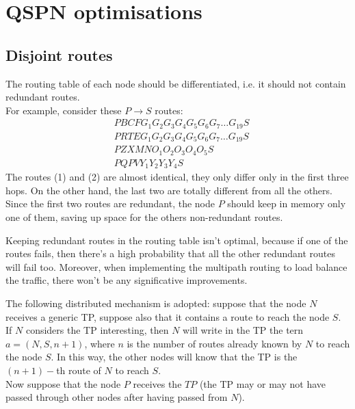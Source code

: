 \documentclass[a4paper]{article}
\begin{document}
%

\section{QSPN optimisations}
\subsection{Disjoint routes}
The routing table of each node should be differentiated, i.e. it should not
contain redundant routes.\\

For example, consider these $P \rightarrow S$ routes:
\begin{align}
	& PBCFG_1G_2G_3G_4G_5G_6G_7 \dots G_{19} S	\\
	& PRTEG_1G_2G_3G_4G_5G_6G_7 \dots G_{19} S	\\
	& PZXMNO_1O_2O_3O_4O_5S				\\
	& PQPVY_1Y_2Y_3Y_4S
\end{align}
The routes (1) and (2) are almost identical, they only differ only in the first three
hops. On the other hand, the last two are totally different from all the others.\\

Since the first two routes are redundant, the node $P$ should keep in memory only
one of them, saving up space for the others non-redundant routes.
\newline

Keeping redundant routes in the routing table isn't optimal, because if one of the
routes fails, then there's a high probability that all the other redundant
routes will fail too. Moreover, when implementing the multipath routing to load
balance the traffic, there won't be any significative improvements.
\newline

The following distributed mechanism is adopted: 
suppose that the node $N$ receives a generic TP, suppose also that it contains
a route to reach the node $S$. If $N$ considers the TP interesting, then
$N$ will write in the TP the tern $a=(N,S,n+1)$, where
$n$ is the number of routes already known by $N$ to reach the node $S$. In
this way, the other nodes will know that the TP is the $(n+1)-$th route of $N$
to reach $S$.\\

Now suppose that the node $P$ receives the $TP$ (the TP may or may not have passed
through other nodes after having passed from $N$).\\
\end{document}
